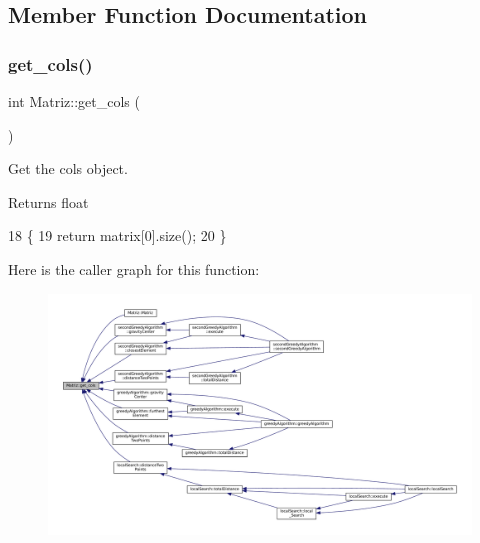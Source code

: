 \subsection{Member Function Documentation}
\mbox{\label{classMatriz_ad6915f9b31f93230a3ce05d01d23a47b}} 
\subsubsection{\texorpdfstring{get\+\_\+cols()}{get\_cols()}}
{\footnotesize\ttfamily int Matriz\+::get\+\_\+cols (\begin{DoxyParamCaption}{ }\end{DoxyParamCaption})}



Get the cols object. 

\begin{DoxyReturn}{Returns}
float 
\end{DoxyReturn}

\begin{DoxyCode}
18 \{
19   \textcolor{keywordflow}{return} matrix[0].size();
20 \}
\end{DoxyCode}
Here is the caller graph for this function\+:
\nopagebreak
\begin{figure}[H]
\begin{center}
\leavevmode
\includegraphics[width=350pt]{classMatriz_ad6915f9b31f93230a3ce05d01d23a47b_icgraph}
\end{center}
\end{figure}
\mbox{\label{classMatriz_aaf1b9c3af2d3b269cc0a2dda08aebd61}} 
